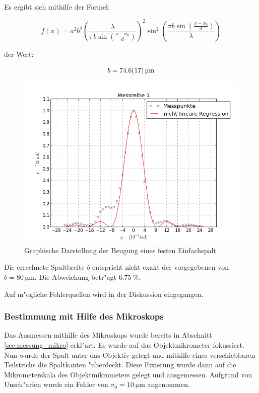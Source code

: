 			Es ergibt sich mithilfe der Formel:

			\begin{equation}
				f(x) = a^2 b^2 \left(\frac{\lambda}{\pi b \sin(\frac{x-x_\mathrm{0}}{d})}\right)^2 \sin^2 \left( \frac{\pi b \sin(\frac{x-x_\mathrm{0}}{d})}{\lambda} \right)
			\end{equation}

			der Wert:

			\begin{equation}
				b = \SI{74.6 (17)}{\micro \meter}
			\end{equation}

			

			\begin{figure}[H]
				\centering
				\includegraphics[width = 16cm]{graph_1.png}
				\caption{Graphische Darstellung der Beugung eines festen Einfachspalt}
				\label{graph1}
			\end{figure}

			Die errechnete Spaltbreite $b$ entspricht nicht exakt der vorgegebenen von $b = \SI{80}{\micro \meter}$. Die Abweichung betr"agt $\SI{6.75}{\percent}$.

			Auf m"ogliche Fehlerquellen wird in der Diskussion eingegangen.
			\newpage

		\subsubsection{Bestimmung mit Hilfe des Mikroskops}
			\label{sub:Bestimmung_mit_Hilfe_des_mikroskops}

			Das Ausmessen mithilfe des Mikroskops wurde bereits in Abschnitt \ref{sec:messung_mikro} erkl"art.
			Es wurde auf das Objektmikrometer fokussiert. Nun wurde der Spalt unter das Objektiv gelegt und mithilfe eines verschiebbaren Teilstrichs die Spaltkanten "uberdeckt. Diese Fixierung wurde dann auf die Mikrometerskala des Objektmikrometers gelegt und ausgemessen.
			Aufgrund von Unsch"arfen wurde ein Fehler von $\sigma_0 = \SI{10}{\micro \meter}$ angenommen.

